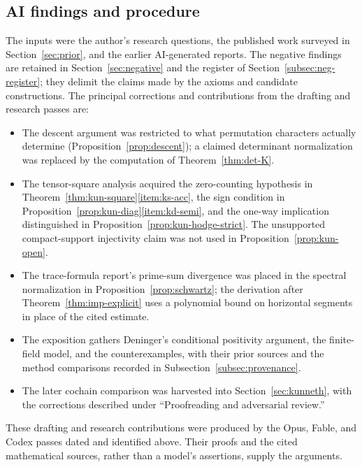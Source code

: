 \documentclass[11pt]{amsart}
\theoremstyle{plain}
\theoremstyle{definition}
\theoremstyle{remark}
\numberwithin{equation}{section}
\begin{document}
\subsection{AI findings and procedure}
The inputs were the author's research questions, the published work
surveyed in Section~\ref{sec:prior}, and the earlier AI-generated reports.
The negative findings are retained in Section~\ref{sec:negative} and the
register of Section~\ref{subsec:neg-register}; they delimit the claims
made by the axioms and candidate constructions. The principal corrections
and contributions from the drafting and research passes are:
\begin{itemize}
\item The descent argument was restricted to what permutation characters
actually determine (Proposition~\ref{prop:descent}); a claimed determinant
normalization was replaced by the computation of
Theorem~\ref{thm:det-K}.
\item The tensor-square analysis acquired the zero-counting hypothesis
in Theorem~\ref{thm:kun-square}\ref{item:ks-acc}, the sign condition in
Proposition~\ref{prop:kun-diag}\ref{item:kd-semi}, and the one-way
implication distinguished in Proposition~\ref{prop:kun-hodge-strict}.
The unsupported compact-support injectivity claim was not used in
Proposition~\ref{prop:kun-open}.
\item The trace-formula report's prime-sum divergence was placed in the
spectral normalization in Proposition~\ref{prop:schwartz}; the derivation
after Theorem~\ref{thm:imp-explicit} uses a polynomial bound on horizontal
segments in place of the cited estimate.
\item The exposition gathers Deninger's conditional positivity argument,
the finite-field model, and the counterexamples, with their prior sources
and the method comparisons recorded in Subsection~\ref{subsec:provenance}.
\item The later cochain comparison was harvested into
Section~\ref{sec:kunneth}, with the corrections described under
``Proofreading and adversarial review.''
\end{itemize}
These drafting and research contributions were produced by the Opus,
Fable, and Codex passes dated and identified above. Their proofs and the
cited mathematical sources, rather than a model's assertions, supply
the arguments.
\end{document}
